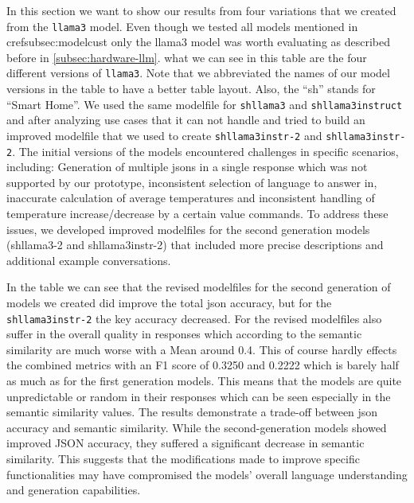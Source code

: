 In this section we want to show our results from four variations that we created from the \texttt{llama3} model. Even though we tested all models mentioned in cref{subsec:modelcust} only the llama3 model was worth evaluating as described before in \cref{subsec:hardware-llm}.
what we can see in this table are the four different versions of \texttt{llama3}. Note that we abbreviated the names of our model versions in the table to have a better table layout. Also, the ``sh'' stands for ``Smart Home''. We used the same modelfile for \texttt{shllama3} and \texttt{shllama3instruct} and after analyzing use cases that it can not handle and tried to build an improved modelfile that we used to create \texttt{shllama3instr-2} and \texttt{shllama3instr-2}.
The initial versions of the models encountered challenges in specific scenarios, including:
Generation of multiple \glspl{json} in a single response which was not supported by our prototype,
inconsistent selection of language to answer in,
inaccurate calculation of average temperatures and
inconsistent handling of temperature increase/decrease by a certain value commands.
To address these issues, we developed improved modelfiles for the second generation models (shllama3-2 and shllama3instr-2) that included more precise descriptions and additional example conversations.


In the table we can see that the revised modelfiles for the second generation of models we created did improve the total \gls{json} accuracy, but for the \texttt{shllama3instr-2} the key accuracy decreased. For the revised modelfiles also suffer in the overall quality in responses which according to the semantic similarity are much worse with a Mean around 0.4.
This of course hardly effects the combined metrics with an F1 score of 0.3250 and 0.2222 which is barely half as much as for the first generation models. This means that the models are quite unpredictable or random in their responses which can be seen especially in the semantic similarity values.
The results demonstrate a trade-off between \gls{json} accuracy and semantic similarity. While the second-generation models showed improved JSON accuracy, they suffered a significant decrease in semantic similarity. This suggests that the modifications made to improve specific functionalities may have compromised the models' overall language understanding and generation capabilities.

